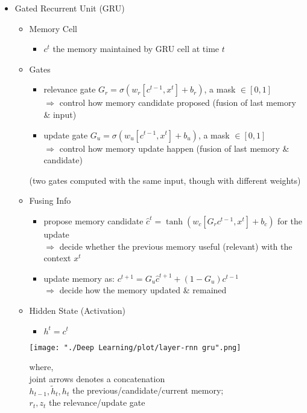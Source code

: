 \begin{itemize}
\begin{itemize}
	\end{itemize}

\item Gated Recurrent Unit (GRU)
	\begin{itemize}
	\item Memory Cell
		\begin{itemize}
		\item $c^t$ the memory maintained by GRU cell at time $t$
		\end{itemize}
	\item Gates
		\begin{itemize}
		\item relevance gate $G_r=\sigma(w_r[c^{t-1}, x^t]+b_r)$, a mask $\in [0,1]$ \\ 
		$\Rightarrow$ control how memory candidate proposed (fusion of last memory \& input)
		\item update gate $G_u=\sigma(w_u[c^{t-1}, x^t]+b_u)$, a mask $\in [0,1]$ \\
		$\Rightarrow$ control how memory update happen (fusion of last memory \& candidate)
		\end{itemize}
		(two gates computed with the same input, though with different weights)
	\item Fusing Info
		\begin{itemize}
		\item propose memory candidate $\hat{c}^{t}=\tanh(w_c[G_r c^{t-1}, x^{t}]+b_c)$ for the update \\
		$\Rightarrow$ decide whether the previous memory useful (relevant) with the context $x^t$
		\item update memory as: $c^{t+1}=G_u \hat{c}^{t+1} + (1-G_u)c^{t-1}$ \\ 
		$\Rightarrow$ decide how the memory updated \& remained
		\end{itemize}
	\item Hidden State (Activation)
		\begin{itemize}
		\item $h^t = c^t$
		\end{itemize}
		
	\begin{minipage}[r]{0.5\linewidth}
	\texttt{[image: "./Deep Learning/plot/layer-rnn gru".png]}
	\end{minipage}
	\begin{minipage}[l]{\linewidth}
	where, \\ 
	joint arrows denotes a concatenation \\ 
	$h_{t-1}, \widetilde h_t, h_t$ the previous/candidate/current memory; \\ 
	$r_t, z_t$ the relevance/update gate
	\end{minipage}
	

\end{itemize}
\end{itemize}
